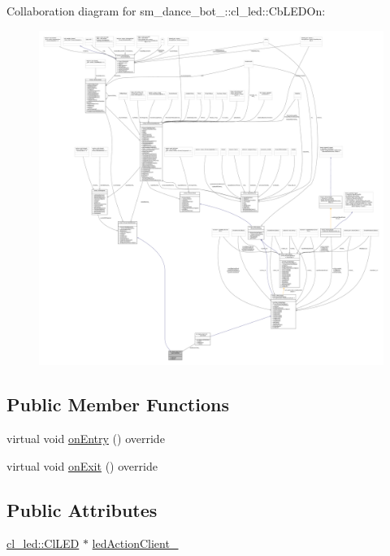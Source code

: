 Collaboration diagram for sm\+\_\+dance\+\_\+bot\+\_\+:\+:cl\+\_\+led\+:\+:Cb\+L\+E\+D\+On\+:
\nopagebreak
\begin{figure}[H]
\begin{center}
\leavevmode
\includegraphics[width=350pt]{classsm__dance__bot__3_1_1cl__led_1_1CbLEDOn__coll__graph}
\end{center}
\end{figure}
\subsection*{Public Member Functions}
\begin{DoxyCompactItemize}
\item 
virtual void \hyperlink{classsm__dance__bot__3_1_1cl__led_1_1CbLEDOn_ab0f04baf2fe19996e5b6d266f612c2da}{on\+Entry} () override
\item 
virtual void \hyperlink{classsm__dance__bot__3_1_1cl__led_1_1CbLEDOn_a321eb11b26db056d477264cc582afbcf}{on\+Exit} () override
\end{DoxyCompactItemize}
\subsection*{Public Attributes}
\begin{DoxyCompactItemize}
\item 
\hyperlink{classsm__dance__bot__3_1_1cl__led_1_1ClLED}{cl\+\_\+led\+::\+Cl\+L\+ED} $\ast$ \hyperlink{classsm__dance__bot__3_1_1cl__led_1_1CbLEDOn_aae93ba81c19acc13ce99b1cd938885ea}{led\+Action\+Client\+\_\+}
\end{DoxyCompactItemize}


